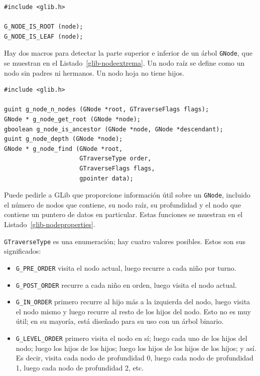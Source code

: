 \begin{lstlisting}[style=GLib/GTK, caption={Predicados para \lstinline{GNode}}, label=glib-nodeextrema]
#include <glib.h>

G_NODE_IS_ROOT (node);
G_NODE_IS_LEAF (node);
\end{lstlisting}

Hay dos macros para detectar la parte superior e inferior de un árbol \lstinline{GNode}, que se muestran en el Listado~\ref{glib-nodeextrema}. Un nodo raíz se define como un nodo sin padres ni hermanos. Un nodo hoja no tiene hijos.

\begin{lstlisting}[style=GLib/GTK, caption={Propiedades de \lstinline{GNode}}, label=glib-nodeproperties]
#include <glib.h>

guint g_node_n_nodes (GNode *root, GTraverseFlags flags);
GNode * g_node_get_root (GNode *node);
gboolean g_node_is_ancestor (GNode *node, GNode *descendant);
guint g_node_depth (GNode *node);
GNode * g_node_find (GNode *root,
                     GTraverseType order,
                     GTraverseFlags flags,
                     gpointer data);
\end{lstlisting}

Puede pedirle a GLib que proporcione información útil sobre un \lstinline{GNode}, incluido el número de nodos que contiene, su nodo raíz, su profundidad y el nodo que contiene un puntero de datos en particular. Estas funciones se muestran en el Listado~\ref{glib-nodeproperties}.

\lstinline{GTraverseType} es una enumeración; hay cuatro valores posibles. Estos son sus significados:
\begin{itemize}
    \item \lstinline{G_PRE_ORDER} visita el nodo actual, luego recurre a cada niño por turno.
    
    \item \lstinline{G_POST_ORDER} recurre a cada niño en orden, luego visita el nodo actual.
    
    \item \lstinline{G_IN_ORDER} primero recurre al hijo más a la izquierda del nodo, luego visita el nodo mismo y luego recurre al resto de los hijos del nodo. Esto no es muy útil; en su mayoría, está diseñado para su uso con un árbol binario.
    
    \item \lstinline{G_LEVEL_ORDER} primero visita el nodo en sí; luego cada uno de los hijos del nodo; luego los hijos de los hijos; luego los hijos de los hijos de los hijos; y así. Es decir, visita cada nodo de profundidad 0, luego cada nodo de profundidad 1, luego cada nodo de profundidad 2, etc.
\end{itemize}

